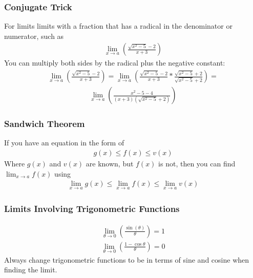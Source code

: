 \documentclass{article}
\newcommand\limxa{\lim_{x\to a}}
\newcommand\limtz{\lim_{\theta\to0}}
\begin{document}
        \subsubsection{Conjugate Trick}
            For limits limits with a fraction that has a radical in the denominator or numerator, such as
            \begin{gather*}
                \limxa\left(\frac{\sqrt{x^2-5}-2}{x+3}\right)
            \end{gather*}
            You can multiply both sides by the radical plus the negative constant:
            \begin{gather*}
                \limxa\left(\frac{\sqrt{x^2-5}-2}{x+3}\right)= \limxa\left(\frac{\sqrt{x^2-5}-2}{x+3}* \frac{\sqrt{x^2-5}+2}{\sqrt{x^2-5}+2}\right)=
            \end{gather*}
            \begin{gather*}
                \limxa\left(\frac{x^2-5-4}{(x+3)(\sqrt{x^2-5}+2)}\right)
            \end{gather*}
        \subsubsection{Sandwich Theorem}
            If you have an equation in the form of
            \begin{gather*}
                g(x) \leq f(x) \leq v(x)
            \end{gather*}
            Where \(g(x)\) and \(v(x)\) are known, but \(f(x)\) is not, then you can find \(\limxa f(x)\) using
            \begin{gather*}
                \limxa g(x) \leq \limxa f(x) \leq \limxa v(x)
            \end{gather*}
        \subsubsection{Limits Involving Trigonometric Functions}
            \begin{gather*}
                \limtz \left(\frac{\sin(\theta)}{\theta}\right) = 1
            \end{gather*}
            \begin{gather*}
                \limtz \left(\frac{1-\cos\theta}{\theta}\right) = 0
            \end{gather*}
            Always change trigonometric functions to be in terms of sine and cosine when finding the limit.
\end{document}
